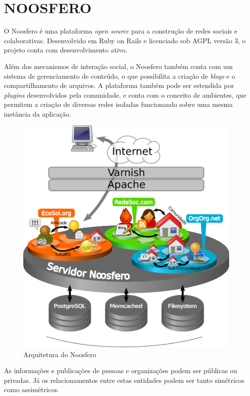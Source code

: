 \chapter{NOOSFERO}

O Noosfero é uma plataforma \textit{open source} para a construção de redes sociais
e colaborativas. Desenvolvido em Ruby on Rails e licenciado sob AGPL versão 3, o
projeto conta com desenvolvimento ativo.

Além dos mecanismos de interação social, o Noosfero também conta com um sistema de
gerenciamento de conteúdo, o que possibilita a criação de \textit{blogs} e o
compartilhamento de arquivos. A plataforma também pode ser estendida por
\textit{plugins} desenvolvidos pela comunidade, e conta com o conceito de ambientes,
que permitem a criação de diversas redes isoladas funcionando sobre uma mesma
instância da aplicação.

\begin{figure}[h]
	\centering
		\includegraphics[keepaspectratio=true,scale=0.4]{figuras/noosfero_estrutura.eps}
	\caption{Arquitetura do Noosfero}
	\label{fig:noosferoEstrutura}
\end{figure}

As informações e publicações de pessoas e organizações podem ser públicas ou
privadas. Já os relacionamentos entre estas entidades podem ser tanto simétricos
como assimétricos.


